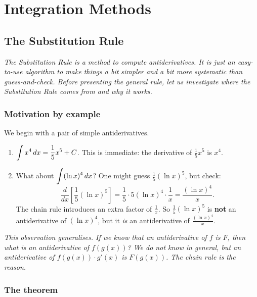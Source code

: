 \chapter{Integration Methods}

\section{The Substitution Rule}
\label{sec:9.1}

\textit{The Substitution Rule is a method to compute antiderivatives.  It is just an easy-to-use algorithm to make things a bit simpler and a bit more systematic than guess-and-check.  Before presenting the general rule, let us investigate where the Substitution Rule comes from and why it works.}

\subsection*{Motivation by example}

We begin with a pair of simple antiderivatives.

\begin{example}
\label{ex:9-1}
\begin{enumerate}[label=(\alph*)]
  \item $\displaystyle\int x^{4}\,dx = \frac{1}{5}x^{5} + C$.  This is immediate: the derivative of $\frac{1}{5}x^{5}$ is $x^{4}$.

  \item What about $\displaystyle\int (\ln x)^{4}\,dx$?  One might guess $\frac{1}{5}(\ln x)^{5}$, but check:
  \[
    \frac{d}{dx}\!\left[\frac{1}{5}(\ln x)^{5}\right] = \frac{1}{5}\cdot 5(\ln x)^{4}\cdot \frac{1}{x} = \frac{(\ln x)^{4}}{x}.
  \]
  The chain rule introduces an extra factor of $\frac{1}{x}$.  So $\frac{1}{5}(\ln x)^{5}$ is \textbf{not} an antiderivative of $(\ln x)^{4}$, but it \textit{is} an antiderivative of $\frac{(\ln x)^{4}}{x}$.
\end{enumerate}
\end{example}

\textit{This observation generalises.  If we know that an antiderivative of $f$ is $F$, then what is an antiderivative of $f(g(x))$?  We do not know in general, but an antiderivative of $f(g(x))\cdot g'(x)$ is $F(g(x))$.  The chain rule is the reason.}

\subsection*{The theorem}

